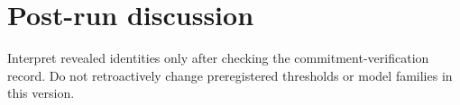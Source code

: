 \section*{Post-run discussion}
Interpret revealed identities only after checking the commitment-verification record. Do not retroactively change preregistered thresholds or model families in this version.
